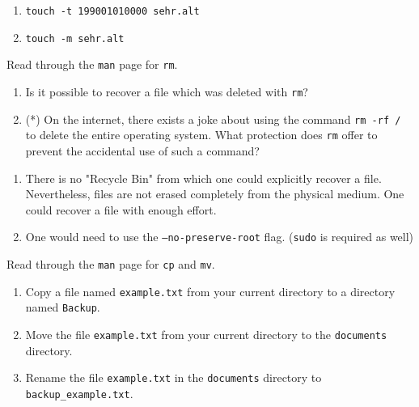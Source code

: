 \documentclass[english]{sheet}
\begin{document}
\begin{solution}
    \begin{enumerate}
        \item \texttt{touch -t 199001010000 sehr.alt}
        \item \texttt{touch -m sehr.alt}
    \end{enumerate}
\end{solution}

\begin{exercise}[subtitle=Deletions with \texttt{rm}]
    Read through the \texttt{man} page for \texttt{rm}.
    \begin{enumerate}
        \item Is it possible to recover a file which was deleted with \texttt{rm}?
        \item (*) On the internet, there exists a joke about using the command \texttt{rm -rf /} to delete the entire operating system. What protection does \texttt{rm} offer to prevent the accidental use of such a command?
    \end{enumerate}
\end{exercise}

\begin{solution}
    \begin{enumerate}
        \item There is no "Recycle Bin" from which one could explicitly recover a file. Nevertheless, files are not erased completely from the physical medium. One could recover a file with enough effort.
        \item One would need to use the \texttt{--no-preserve-root} flag. (\texttt{sudo} is required as well)
    \end{enumerate}
\end{solution}

\begin{exercise}[subtitle=File manipulation with \texttt{cp} and \texttt{mv}]
    Read through the \texttt{man} page for \texttt{cp} and \texttt{mv}.
    \begin{enumerate}
        \item Copy a file named \texttt{example.txt} from your current directory to a directory named \texttt{Backup}.
        \item Move the file \texttt{example.txt} from your current directory to the \texttt{documents} directory.
        \item Rename the file \texttt{example.txt} in the \texttt{documents} directory to \texttt{backup_example.txt}.
    \end{enumerate}
\end{exercise}
\end{document}
